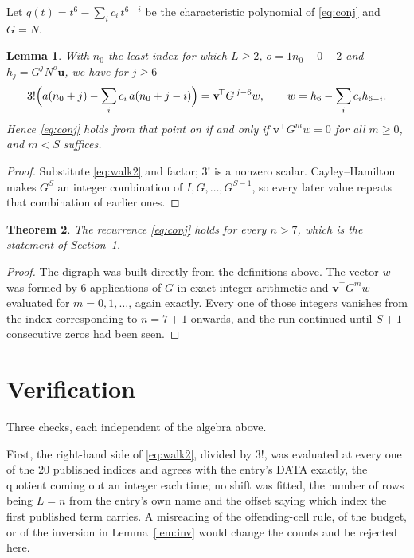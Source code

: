 \documentclass[11pt,a4paper]{article}
\theoremstyle{plain}
\newtheorem{theorem}{Theorem}
\newtheorem{lemma}[theorem]{Lemma}
\theoremstyle{definition}
\begin{document}
Let $q(t)=t^{6}-\sum_i c_i\,t^{6-i}$ be the characteristic polynomial of
\eqref{eq:conj} and $G=N$.

\begin{lemma}\label{lem:crit}
With $n_0$ the least index for which $L\ge2$, $o=1n_0+0-2$ and
$h_j=G^{j}N^{o}\mathbf{u}$, we have for $j\ge6$
\[
3!\Bigl(a(n_0+j)-\sum_i c_i\,a(n_0+j-i)\Bigr)=\mathbf{v}^{\!\top}G^{\,j-6}w,
\qquad w=h_{6}-\sum_i c_i h_{6-i} .
\]
Hence \eqref{eq:conj} holds from that point on if and only if
$\mathbf{v}^{\!\top}G^{m}w=0$ for all $m\ge0$, and $m<S$ suffices.
\end{lemma}

\begin{proof}
Substitute \eqref{eq:walk2} and factor; $3!$ is a nonzero scalar. Cayley--Hamilton
makes $G^{S}$ an integer combination of $I,G,\dots,G^{S-1}$, so every later value repeats
that combination of earlier ones.
\end{proof}

\begin{theorem}
The recurrence \eqref{eq:conj} holds for every $n>7$, which is the statement of
Section~1.
\end{theorem}

\begin{proof}
The digraph was built directly from the definitions above. The vector $w$ was formed by
$6$ applications of $G$ in exact integer arithmetic and $\mathbf{v}^{\!\top}G^{m}w$
evaluated for $m=0,1,\dots$, again exactly. Every one of those integers vanishes from the
index corresponding to $n=7+1$ onwards, and the run continued until $S+1$ consecutive
zeros had been seen.
\end{proof}

\section{Verification}

Three checks, each independent of the algebra above.

First, the right-hand side of \eqref{eq:walk2}, divided by $3!$, was evaluated at every
one of the $20$ published indices and agrees with the entry's DATA exactly, the quotient
coming out an integer each time; no shift was fitted, the number of rows being
$L=n$ from the entry's own name and the offset saying which index the first published
term carries. A misreading of the offending-cell rule, of the budget, or of the inversion in
Lemma~\ref{lem:inv} would change the counts and be rejected here.
\end{document}
